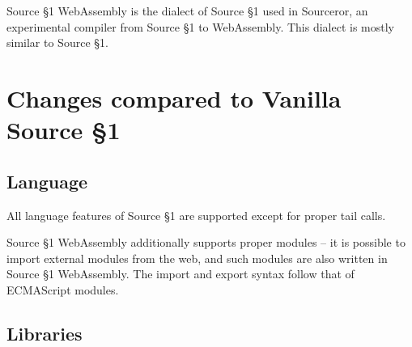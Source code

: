 

\newcommand{\Rule}[2]{\genfrac{}{}{0.7pt}{}{{\setlength{\fboxrule}{0pt}\setlength{\fboxsep}{3mm}\fbox{$#1$}}}{{\setlength{\fboxrule}{0pt}\setlength{\fboxsep}{3mm}\fbox{$#2$}}}}

\newcommand{\TruE}{\textbf{\texttt{true}}}
\newcommand{\FalsE}{\textbf{\texttt{false}}}
\newcommand{\Rc}{\texttt{\}}}
\newcommand{\Lc}{\texttt{\{}}
\newcommand{\Rp}{\texttt{)}}
\newcommand{\Lp}{\texttt{(}}
\newcommand{\Fun}{\textbf{\texttt{function}}}
\newcommand{\Let}{\textbf{\texttt{let}}}
\newcommand{\Return}{\textbf{\texttt{return}}}
\newcommand{\Const}{\textbf{\texttt{const}}}
\newcommand{\If}{\textbf{\texttt{if}}}
\newcommand{\Else}{\textbf{\texttt{else}}}
\newcommand{\Bool}{\texttt{bool}}
\newcommand{\Number}{\texttt{number}}
\newcommand{\String}{\texttt{string}}
\newcommand{\Undefined}{\texttt{undefined}}

\newtheorem{definition}{Definition}[section]





Source \S 1 WebAssembly is the dialect of Source \S 1 used in Sourceror, an experimental compiler from Source \S 1 to WebAssembly.  This dialect is mostly similar to Source \S 1.

\section{Changes compared to Vanilla Source \S 1}

\subsection*{Language}  

All language features of Source \S 1 are supported except for proper tail calls.

Source \S 1 WebAssembly additionally supports proper modules -- it is possible to import external modules from the web, and such modules are also written in Source \S 1 WebAssembly.  The import and export syntax follow that of ECMAScript modules.

\subsection*{Libraries}

